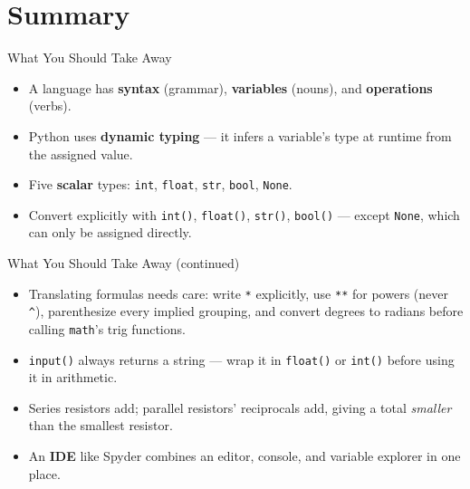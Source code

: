 \documentclass[9pt,aspectratio=169,xcolor=table]{beamer}
\begin{document}
\section{Summary}

\begin{frame}{What You Should Take Away}
    \leavevmode
    \small
    \begin{itemize}
        \item A language has \textbf{syntax} (grammar), \textbf{variables}
              (nouns), and \textbf{operations} (verbs).
        \item Python uses \textbf{dynamic typing} --- it infers a
              variable's type at runtime from the assigned value.
        \item Five \textbf{scalar} types: \texttt{int}, \texttt{float},
              \texttt{str}, \texttt{bool}, \texttt{None}.
        \item Convert explicitly with \texttt{int()}, \texttt{float()},
              \texttt{str()}, \texttt{bool()} --- except \texttt{None},
              which can only be assigned directly.
    \end{itemize}
\end{frame}

\begin{frame}{What You Should Take Away (continued)}
    \leavevmode
    \small
    \begin{itemize}
        \item Translating formulas needs care: write \texttt{*}
              explicitly, use \texttt{**} for powers (never
              \texttt{\^{}}), parenthesize every implied grouping, and
              convert degrees to radians before calling \texttt{math}'s
              trig functions.
        \item \texttt{input()} \alert{always} returns a string --- wrap
              it in \texttt{float()} or \texttt{int()} before using it
              in arithmetic.
        \item Series resistors add; parallel resistors' reciprocals add,
              giving a total \emph{smaller} than the smallest resistor.
        \item An \textbf{IDE} like Spyder combines an editor, console,
              and variable explorer in one place.
    \end{itemize}
\end{frame}
\end{document}
